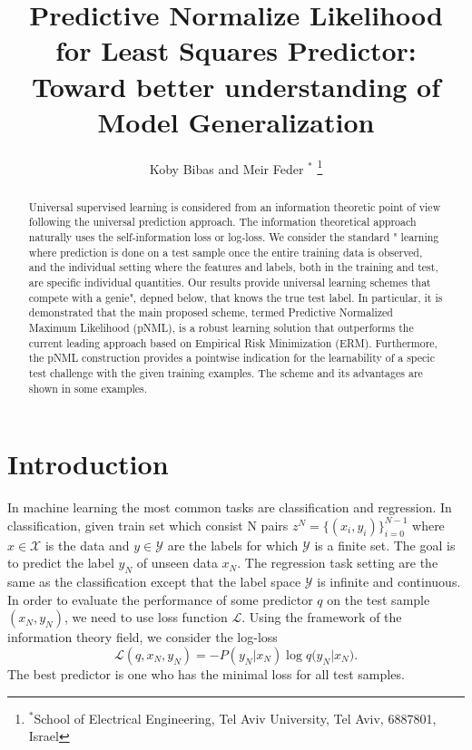 \documentclass[letterpaper, 10 pt, conference]{ieeeconf}  %
\title{\LARGE \bf
Predictive Normalize Likelihood for Least Squares Predictor: Toward better understanding of Model Generalization
}
\author{Koby Bibas and Meir Feder $^{*}$%
\thanks{$^{*}$School of Electrical Engineering,
	Tel Aviv University, Tel Aviv, 6887801, Israel}
}
\begin{document}
\maketitle
\thispagestyle{empty}
\pagestyle{empty}


\begin{abstract}
Universal supervised learning is considered from an information theoretic point of view following the universal prediction approach. The information
theoretical approach naturally uses the self-information loss or log-loss. We consider the standard " learning where prediction is done on a test sample once the entire training data is
observed, and the individual setting where the features and labels, both in the training and test,
are specific individual quantities.
Our results provide universal learning schemes that compete with a genie", depned below,
that knows the true test label. In particular, it is demonstrated that the main proposed scheme,
termed Predictive Normalized Maximum Likelihood (pNML), is a robust learning solution
that outperforms the current leading approach based on Empirical Risk Minimization (ERM).
Furthermore, the pNML construction provides a pointwise indication for the learnability of a
specic test challenge with the given training examples. The scheme and its advantages are
shown in some examples.
\end{abstract}






\section{Introduction} \label{Introduction}
In machine learning the most common tasks are classification and regression. In classification, given train set which consist N pairs $z^N=\{(x_i, y_i)\}_{i=0}^{N-1}$ where $x \in \mathcal{X}$ is the data and $y \in \mathcal{Y}$ are the labels for which $\mathcal{Y}$ is a finite set. The goal is to predict the label $y_N$ of unseen data $x_N$. The regression task setting are the same as the classification except that the label space $\mathcal{Y}$ is infinite and continuous.
In order to evaluate the performance of some predictor $q$ on the test sample $(x_N, y_N)$, we need to use loss function  $\mathcal{L}$. Using the framework of the information theory field, we consider the log-loss
\begin{equation}
 \mathcal{L}(q,x_N,y_N) = -P(y_N|x_N)\log {q(y_N|x_N}).
\end{equation}
The best predictor is one who has the minimal loss for all test samples.
\end{document}
